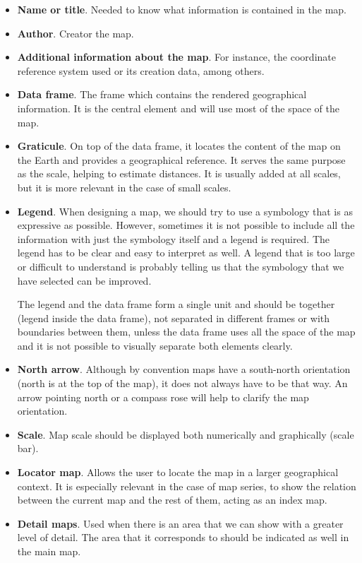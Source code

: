 \begin{itemize}
\item \textbf{Name or title}. Needed to know what information is contained in the map.
	\item \textbf{Author}. Creator the map.
	\item \textbf{Additional information about the map}. For instance, the coordinate reference system used or its creation data, among others.
	\item \textbf{Data frame}. The frame which contains the rendered geographical information. It is the central element and will use most of the space of the map. 
	\item \textbf{Graticule}. On top of the data frame, it locates the content of the map on the Earth and provides a geographical reference. It serves the same purpose as the scale, helping to estimate distances. It is usually added at all scales, but it is more relevant in the case of small scales.
	\item \textbf{Legend}. When designing a map, we should try to use a symbology that is as expressive as possible. However, sometimes it is not possible to include all the information with just the symbology itself and a legend is required. The legend has to be clear and easy to interpret as well. A legend that is too large or difficult to understand is probably telling us that the symbology that we have selected can be improved.
	
	The legend and the data frame form a single unit and should be together (legend inside the data frame), not separated in different frames or with boundaries between them, unless the data frame uses all the space of the map and it is not possible to visually separate both elements clearly.
	

	\item \textbf{North arrow}. Although by convention maps have a south-north orientation (north is at the top of the map), it does not always have to be that way. An arrow pointing north or a compass rose will help to clarify the map orientation.
	\item \textbf{Scale}. Map scale should be displayed both numerically and graphically (scale bar).
	\item \textbf{Locator map}. Allows the user to locate the map in a larger geographical context. It is especially relevant in the case of map series, to show the relation between the current map and the rest of them, acting as an index map.
	\item \textbf{Detail maps}. Used when there is an area that we can show with a greater level of detail. The area that it corresponds to should be indicated as well in the main map. 
\end{itemize}

